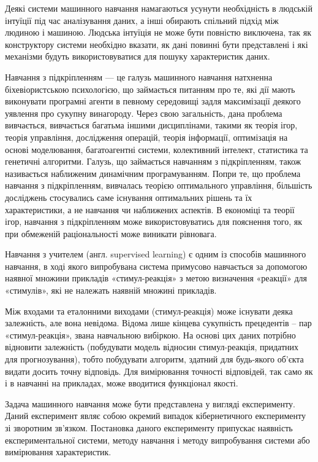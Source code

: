 Деякі системи машинного навчання намагаються усунути необхідність в людській інтуїції під час аналізування даних, а інші обирають спільний підхід між людиною і машиною. Людська інтуїція не може бути повністю виключена, так як конструктору системи необхідно вказати, як дані повинні бути представлені і які механізми будуть використовуватися для пошуку характеристик даних.

Навчання з підкріпленням — це галузь машинного навчання натхненна біхевіористською психологією, що займається питанням про те, які дії мають виконувати програмні агенти в певному середовищі задля максимізації деякого уявлення про сукупну винагороду. Через свою загальність, дана проблема вивчається, вивчається багатьма іншими дисциплінами, такими як теорія ігор, теорія управління, дослідження операцій, теорія інформації, оптимізація на основі моделювання, багатоагентні системи, колективний інтелект, статистика та генетичні алгоритми. Галузь, що займається навчанням з підкріпленням, також називається наближеним динамічним програмуванням. Попри те, що проблема навчання з підкріпленням, вивчалась теорією оптимального управління, більшість досліджень стосувались саме існування оптимальних рішень та їх характеристики, а не навчання чи наближених аспектів. В економіці та теорії ігор, навчання з підкріпленням може використовуватись для пояснення того, як при обмеженій раціональності може виникати рівновага.

Навчання з учителем (англ. supervised learning) є одним із способів машинного навчання, в ході якого випробувана система примусово навчається за допомогою наявної множини прикладів «стимул-реакція» з метою визначення «реакції» для «стимулів», які не належать наявній множині прикладів. 

Між входами та еталонними виходами (стимул-реакція) може існувати деяка залежність, але вона невідома. Відома лише кінцева сукупність прецедентів – пар «стимул-реакція», звана навчальною вибіркою. На основі цих даних потрібно відновити залежність (побудувати модель відносин стимул-реакція, придатних для прогнозування), тобто побудувати алгоритм, здатний для будь-якого об'єкта видати досить точну відповідь. Для вимірювання точності відповідей, так само як і в навчанні на прикладах, може вводитися функціонал якості.

Задача машинного навчання може бути представлена у вигляді експерименту. Даний експеримент являє собою окремий випадок кібернетичного експерименту зі зворотним зв'язком. Постановка даного експерименту припускає наявність експериментальної системи, методу навчання і методу випробування системи або вимірювання характеристик.

